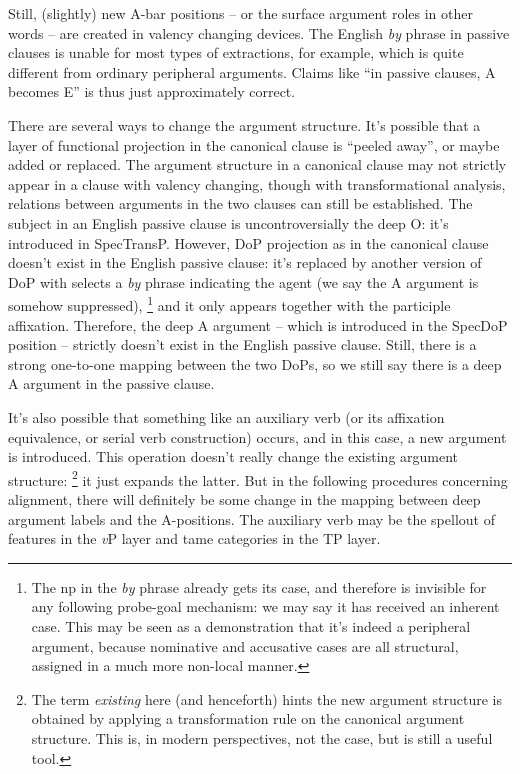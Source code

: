 \documentclass[UTF8, a4paper, oneside, scheme=plain]{ctexart}
\newcommand*{\term}[1]{\emph{#1}}
\newcommand*{\corpus}[1]{\emph{#1}}
\newcommand*{\vP}{\textit{v}P}
\begin{document}
Still, (slightly) new A-bar positions -- or the surface argument roles in other words -- are created
in valency changing devices. 
The English \corpus{by} phrase in passive clauses
is unable for most types of extractions, for example,
which is quite different from ordinary peripheral arguments.
Claims like ``in passive clauses, A becomes E'' is thus just approximately correct.

There are several ways to change the argument structure.
It's possible that a layer of functional projection in the canonical clause is ``peeled away'',
or maybe added or replaced.
The argument structure in a canonical clause 
may not strictly appear in a clause with valency changing,
though with transformational analysis,
relations between arguments in the two clauses can still be established.
The subject in an English passive clause is uncontroversially the deep O:
it's introduced in SpecTransP.
However, DoP projection as in the canonical clause doesn't exist in the English passive clause:
it's replaced by another version of DoP with selects a \corpus{by} phrase indicating the agent
(we say the A argument is somehow suppressed),%
\footnote{
    The \ac{np} in the \corpus{by} phrase already gets its case,
    and therefore is invisible for any following probe-goal mechanism:
    we may say it has received an inherent case.
    This may be seen as a demonstration that it's indeed a peripheral argument,
    because nominative and accusative cases are all structural,
    assigned in a much more non-local manner.
}
and it only appears together with the participle affixation.
Therefore, the deep A argument -- which is introduced in the SpecDoP position -- 
strictly doesn't exist in the English passive clause.
Still, there is a strong one-to-one mapping between the two DoPs,
so we still say there is a deep A argument in the passive clause.

It's also possible that something like an auxiliary verb 
(or its affixation equivalence, or serial verb construction) occurs,
and in this case, 
a new argument is introduced.
This operation doesn't really change the existing argument structure:%
\footnote{
    The term \term{existing} here (and henceforth) hints the new argument structure is obtained by
    applying a transformation rule on the canonical argument structure.
    This is, in modern perspectives, not the case,
    but is still a useful tool.
}
it just expands the latter.
But in the following procedures concerning alignment,
there will definitely be some change
in the mapping between deep argument labels and the A-positions.
The auxiliary verb may be the spellout of features in the \vP{} layer
and \ac{tame} categories in the TP layer.
\end{document}
